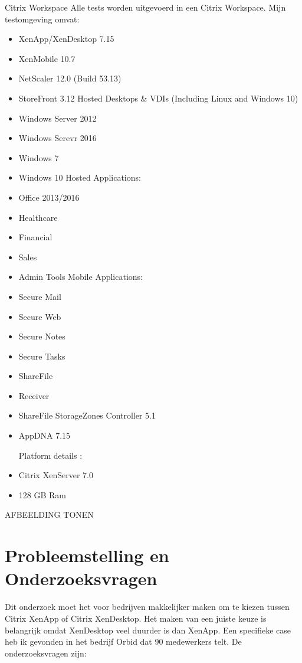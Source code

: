 \begin{itemize}
\begin{itemize}
Citrix Workspace
Alle tests worden uitgevoerd in een Citrix Workspace. Mijn testomgeving omvat:
\begin{itemize}
	\item XenApp/XenDesktop 7.15
	\item XenMobile 10.7
	\item NetScaler 12.0 (Build 53.13)
	\item StoreFront 3.12
	\newline
	Hosted Desktops & VDIs (Including Linux and Windows 10)
	\item Windows Server 2012
	\item Windows Serevr 2016
	\item Windows 7
	\item Windows 10
	\newline
	Hosted Applications:
	\item Office 2013/2016
	\item Healthcare
	\item Financial
	\item Sales
	\item Admin Tools
	\newline
	Mobile Applications:
	\item Secure Mail
	\item Secure Web
	\item Secure Notes
	\item Secure Tasks
	\item ShareFile
	\item Receiver
	\item ShareFile StorageZones Controller 5.1
	\item AppDNA 7.15
	
	\newline
	Platform details :
	\item Citrix XenServer 7.0
	\item 128 GB Ram
	
\end{itemize}

AFBEELDING TONEN



\section{Probleemstelling en Onderzoeksvragen}
\label{sec:onderzoeksvragen}

Dit onderzoek moet het voor bedrijven makkelijker maken om te kiezen tussen Citrix XenApp of Citrix XenDesktop. Het maken van een juiste keuze is belangrijk omdat XenDesktop veel duurder is dan XenApp. Een specifieke case heb ik gevonden in het bedrijf Orbid dat 90 medewerkers telt. De onderzoeksvragen zijn:


\end{itemize}
\end{itemize}
